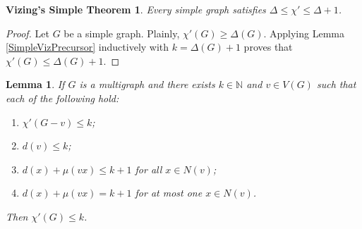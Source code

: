 \documentclass[12pt]{article}
\theoremstyle{plain}
\newtheorem{lem}[thm]{Lemma}
\newtheorem*{VizingSimple}{Vizing's Simple Theorem}
\theoremstyle{definition}
\theoremstyle{remark}
\begin{document}
\begin{VizingSimple}
Every simple graph satisfies $\Delta \leq \chi' \leq \Delta + 1$.
\end{VizingSimple}
\begin{proof}
Let $G$ be a simple graph.  Plainly, $\chi'(G) \geq \Delta(G)$.  Applying Lemma \ref{SimpleVizPrecursor} inductively with $k = \Delta(G) + 1$ proves that $\chi'(G) \leq \Delta(G) + 1$.
\end{proof}


\begin{lem}\label{MultiVizPrecursor}
If $G$ is a multigraph and there exists $k \in \mathbb{N}$ and $v \in V(G)$ such that each of the following hold:
\begin{enumerate}
\item $\chi'(G - v) \leq k$;
\item $d(v) \leq k$;
\item $d(x) + \mu(vx) \leq k + 1$ for all $x \in N(v)$;
\item $d(x) + \mu(vx) = k + 1$ for at most one $x \in N(v)$.
\end{enumerate}
Then $\chi'(G) \leq k$.
\end{lem}
\end{document}
